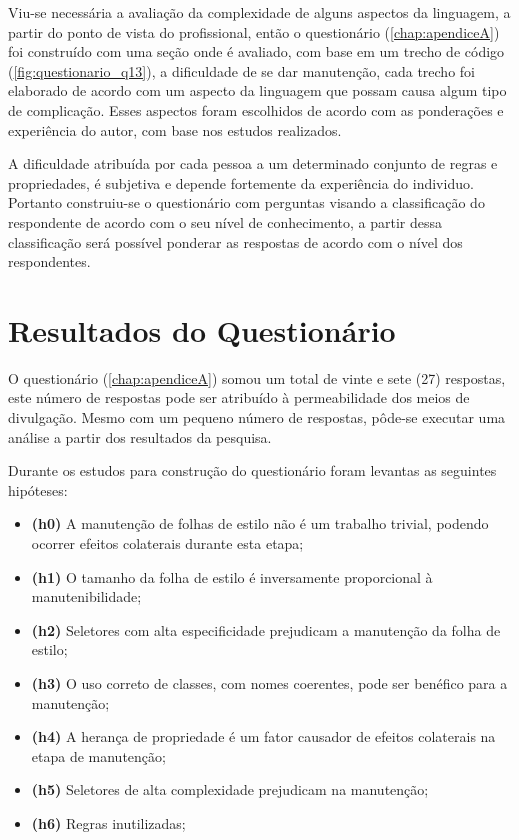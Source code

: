 Viu-se necessária a avaliação da complexidade de alguns aspectos da linguagem, a partir do ponto de vista do profissional, então o questionário (\autoref{chap:apendiceA}) foi construído com uma seção onde é avaliado, com base em um trecho de código (\autoref{fig:questionario_q13}), a dificuldade de se dar manutenção, cada trecho foi elaborado de acordo com um aspecto da linguagem que possam causa algum tipo de complicação. Esses aspectos foram escolhidos de acordo com as ponderações e experiência do autor, com base nos estudos realizados.

A dificuldade atribuída por cada pessoa a um determinado conjunto de regras e propriedades, é subjetiva e depende fortemente da experiência do individuo. Portanto construiu-se o questionário com perguntas visando a classificação do respondente de acordo com o seu nível de conhecimento, a partir dessa classificação será possível ponderar as respostas de acordo com o nível dos respondentes.

\section{Resultados do Questionário}

O questionário (\autoref{chap:apendiceA}) somou um total de vinte e sete (27) respostas, este número de respostas pode ser atribuído à permeabilidade dos meios de divulgação. Mesmo com um pequeno número de respostas, pôde-se executar uma análise a partir dos resultados da pesquisa. 

Durante os estudos para construção do questionário foram levantas as seguintes hipóteses:

\begin{itemize}
	\item \textbf{(h0)} A manutenção de folhas de estilo não é um trabalho trivial, podendo ocorrer efeitos colaterais durante esta etapa;
	\item \textbf{(h1)} O tamanho da folha de estilo é inversamente proporcional à manutenibilidade;
	\item \textbf{(h2)} Seletores com alta especificidade prejudicam a manutenção da folha de estilo;
	\item \textbf{(h3)} O uso correto de classes, com nomes coerentes, pode ser benéfico para a manutenção;
	\item \textbf{(h4)} A herança de propriedade é um fator causador de efeitos colaterais na etapa de manutenção;
	\item \textbf{(h5)} Seletores de alta complexidade prejudicam na manutenção;
	\item \textbf{(h6)} Regras inutilizadas;
\end{itemize}

